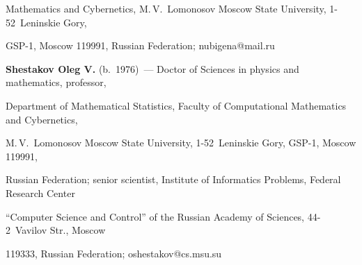 Mathematics and Cybernetics, M.\,V.~Lomonosov Moscow State University, 1-52~Leninskie Gory, 


GSP-1, Moscow 119991, Russian Federation; \mbox{nubigena@mail.ru}





\vspace*{3pt}





\noindent


\textbf{Shestakov Oleg V.} (b.\ 1976)~--- Doctor of Sciences in physics and mathematics, professor, 


Department of Mathematical Statistics, Faculty of Computational Mathematics and Cybernetics, 


M.\,V.~Lomonosov Moscow State University, \mbox{1-52}~Leninskie Gory, GSP-1, Moscow 119991, 


Russian Federation; senior scientist, Institute of Informatics Problems, Federal Research Center 


``Computer Science and Control'' of the Russian Academy of Sciences, 44-2~Vavilov Str., Moscow 


119333, Russian Federation; \mbox{oshestakov@cs.msu.su}


\label{end\stat}





\renewcommand{\bibname}{\protect\rm Литература} 


